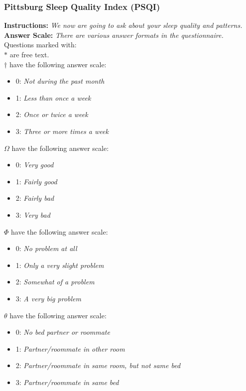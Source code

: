 \subsubsection{Pittsburg Sleep Quality Index (PSQI)}
\textbf{Instructions:} \emph{We now are going to ask about your sleep quality and patterns.}
\\
\textbf{Answer Scale:} \emph{There are various answer formats in the questionnaire.} Questions marked with:
\\
$\ast$ are free text.
\\
$\dagger$ have the following answer scale:
\begin{itemize}
    \item 0: \emph{Not during the past month}
    \item 1: \emph{Less than once a week}
    \item 2: \emph{Once or twice a week}
    \item 3: \emph{Three or more times a week}
\end{itemize}
$\Omega$ have the following answer scale:
\begin{itemize}
    \item 0: \emph{Very good}
    \item 1: \emph{Fairly good}
    \item 2: \emph{Fairly bad}
    \item 3: \emph{Very bad}
\end{itemize}
$\Phi$ have the following answer scale:
\begin{itemize}
    \item 0: \emph{No problem at all}
    \item 1: \emph{Only a very slight problem}
    \item 2: \emph{Somewhat of a problem}
    \item 3: \emph{A very big problem}
\end{itemize}
$\theta$ have the following answer scale:
\begin{itemize}
    \item 0: \emph{No bed partner or roommate}
    \item 1: \emph{Partner/roommate in other room}
    \item 2: \emph{Partner/roommate in same room, but not same bed}
    \item 3: \emph{Partner/roommate in same bed}
\end{itemize}
